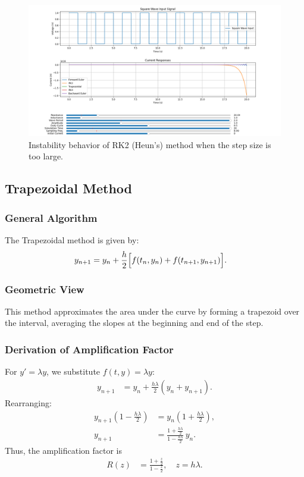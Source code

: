 \documentclass[12pt]{article}
\begin{document}
\begin{figure}[htbp]
  \centering
  \includegraphics[width=\textwidth]{figs/instability_rk2.png}
  \caption{Instability behavior of RK2 (Heun's) method when the step size is too large.}
  \label{fig:instability_rk2}
\end{figure}

\subsection{Trapezoidal Method}

\subsubsection*{General Algorithm}
The Trapezoidal method is given by:
\begin{align}
y_{n+1} &= y_n + \frac{h}{2}\Bigl[f(t_n,y_n)+f(t_{n+1},y_{n+1})\Bigr].
\end{align}

\subsubsection*{Geometric View}
This method approximates the area under the curve by forming a trapezoid over the interval, averaging the slopes at the beginning and end of the step.

\subsubsection*{Derivation of Amplification Factor}
For $y'=\lambda y$, we substitute $f(t,y)=\lambda y$:
\begin{align}
y_{n+1} &= y_n + \frac{h\lambda}{2}(y_n+y_{n+1}).
\end{align}
Rearranging:
\begin{align}
y_{n+1}\left(1-\frac{h\lambda}{2}\right) &= y_n\left(1+\frac{h\lambda}{2}\right), \\
y_{n+1} &= \frac{1+\frac{h\lambda}{2}}{1-\frac{h\lambda}{2}}\, y_n.
\end{align}
Thus, the amplification factor is 
\begin{align}
R(z) &= \frac{1+\frac{z}{2}}{1-\frac{z}{2}}, \quad z=h\lambda.
\end{align}
\end{document}
